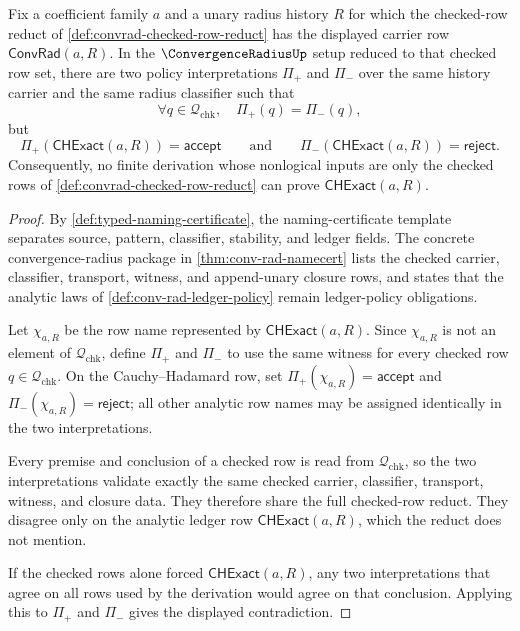 \begin{theorem}
\label{thm:convrad-checked-rows-do-not-force-cauchy-hadamard}
Fix a coefficient family $a$ and a unary radius history $R$ for which the
checked-row reduct of \autoref{def:convrad-checked-row-reduct} has the
displayed carrier row $\mathsf{ConvRad}(a,R)$. In the
$\ConvergenceRadiusUp$ setup reduced to that checked row set, there are two
policy interpretations $\Pi_{+}$ and $\Pi_{-}$ over the same history carrier
and the same radius classifier such that
$$
\forall q\in\mathcal Q_{\mathrm{chk}},\quad \Pi_{+}(q)=\Pi_{-}(q),
$$
but
$$
\Pi_{+}(\mathsf{CHExact}(a,R))=\mathsf{accept}
\qquad\text{and}\qquad
\Pi_{-}(\mathsf{CHExact}(a,R))=\mathsf{reject}.
$$
Consequently, no finite derivation whose nonlogical inputs are only the
checked rows of \autoref{def:convrad-checked-row-reduct} can prove
$\mathsf{CHExact}(a,R)$.
\end{theorem}
\begin{proof}
By \autoref{def:typed-naming-certificate}, the naming-certificate template
separates source, pattern, classifier, stability, and ledger fields. The
concrete convergence-radius package in \autoref{thm:conv-rad-namecert} lists
the checked carrier, classifier, transport, witness, and append-unary closure
rows, and states that the analytic laws of \autoref{def:conv-rad-ledger-policy}
remain ledger-policy obligations.

Let $\chi_{a,R}$ be the row name represented by
$\mathsf{CHExact}(a,R)$. Since $\chi_{a,R}$ is not an element of
$\mathcal Q_{\mathrm{chk}}$, define $\Pi_{+}$ and $\Pi_{-}$ to use the same
witness for every checked row $q\in\mathcal Q_{\mathrm{chk}}$. On the
Cauchy--Hadamard row, set $\Pi_{+}(\chi_{a,R})=\mathsf{accept}$ and
$\Pi_{-}(\chi_{a,R})=\mathsf{reject}$; all other analytic row names may be
assigned identically in the two interpretations.

Every premise and conclusion of a checked row is read from
$\mathcal Q_{\mathrm{chk}}$, so the two interpretations validate exactly the
same checked carrier, classifier, transport, witness, and closure data. They
therefore share the full checked-row reduct. They disagree only on the analytic
ledger row $\mathsf{CHExact}(a,R)$, which the reduct does not mention.

If the checked rows alone forced $\mathsf{CHExact}(a,R)$, any two
interpretations that agree on all rows used by the derivation would agree on
that conclusion. Applying this to $\Pi_{+}$ and $\Pi_{-}$ gives the displayed
contradiction.
\end{proof}

